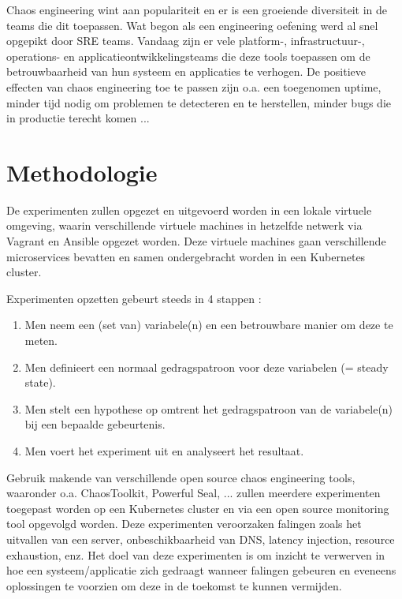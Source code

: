 Chaos engineering wint aan populariteit en er is een groeiende diversiteit in de teams die dit toepassen. Wat begon als een engineering oefening werd al snel opgepikt door SRE teams. Vandaag zijn er vele platform-, infrastructuur-, operations- en applicatieontwikkelingsteams die deze tools toepassen om de betrouwbaarheid van hun systeem en applicaties te verhogen.
De positieve effecten van chaos engineering toe te passen zijn o.a. een toegenomen uptime, minder tijd nodig om problemen te detecteren en te herstellen, minder bugs die in productie terecht komen ... \autocite{KoltonAndrus2021}


\section{Methodologie}
\label{sec:methodologie}

De experimenten zullen opgezet en uitgevoerd worden in een lokale virtuele omgeving, waarin verschillende virtuele machines in hetzelfde netwerk via Vagrant en Ansible opgezet worden. Deze virtuele machines gaan  verschillende microservices bevatten en  samen ondergebracht worden in een Kubernetes cluster. 

Experimenten opzetten gebeurt steeds in 4 stappen \autocite{Pawlikowski2020}:
\begin{enumerate}
    \item Men neem een (set van) variabele(n) en een betrouwbare manier om deze te meten.
    \item Men definieert een normaal gedragspatroon voor deze variabelen (= steady state).
    \item Men stelt een hypothese op omtrent het gedragspatroon van de variabele(n) bij een bepaalde gebeurtenis.
    \item Men voert het experiment uit en analyseert het resultaat.
\end{enumerate}
Gebruik makende van verschillende open source chaos engineering tools, waaronder o.a. ChaosToolkit, Powerful Seal, ... zullen meerdere experimenten toegepast worden op een Kubernetes cluster en via een open source monitoring tool opgevolgd worden. Deze experimenten veroorzaken falingen zoals het uitvallen van een server, onbeschikbaarheid van DNS, latency injection, resource exhaustion, enz. Het doel van deze experimenten is om inzicht te verwerven in hoe een systeem/applicatie zich gedraagt wanneer falingen gebeuren en eveneens oplossingen te voorzien om deze in de toekomst te kunnen vermijden. 



